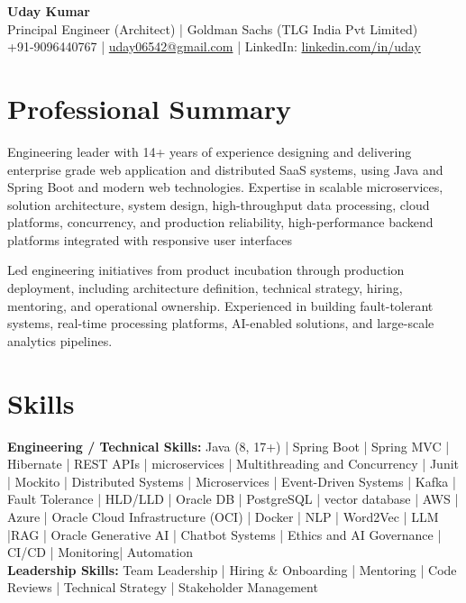 \documentclass[11pt,a4paper]{article}
\begin{document}
\begin{center}
    {\LARGE \textbf{Uday Kumar}} \\[4pt]
    
     Principal Engineer (Architect) \; | \; Goldman Sachs (TLG India Pvt Limited) \\[4pt]
    
    +91-9096440767 \; | \;
    \href{mailto:uday06542@gmail.com}{uday06542@gmail.com}
    \; | \;
    LinkedIn:
    \href{https://www.linkedin.com/in/uday/}{linkedin.com/in/uday}
\end{center}

\section*{Professional Summary}

Engineering leader with 14+ years of experience designing and delivering enterprise grade web application and  distributed SaaS systems, using Java and Spring Boot and modern web technologies. Expertise in scalable microservices, solution architecture, system design, high-throughput data processing, cloud platforms, concurrency, and production reliability, high-performance backend platforms integrated with responsive user interfaces

Led engineering initiatives from product incubation through production deployment, including architecture definition, technical strategy, hiring, mentoring, and operational ownership. Experienced in building fault-tolerant systems, real-time processing platforms, AI-enabled solutions, and large-scale analytics pipelines.

\section*{Skills}

\textbf{Engineering / Technical Skills:} Java (8, 17+) | Spring Boot | Spring MVC | Hibernate | REST APIs | microservices | Multithreading and Concurrency | Junit | 
Mockito | Distributed Systems | Microservices | Event-Driven Systems | Kafka | Fault Tolerance | HLD/LLD | Oracle DB | PostgreSQL | vector database | AWS | Azure | Oracle Cloud Infrastructure (OCI) | Docker | NLP | Word2Vec | LLM |RAG | Oracle Generative AI | Chatbot Systems | Ethics and AI Governance | CI/CD | Monitoring| Automation \\
\textbf{Leadership Skills:} Team Leadership | Hiring \& Onboarding | Mentoring | Code Reviews | Technical Strategy | Stakeholder Management \\
\end{document}
